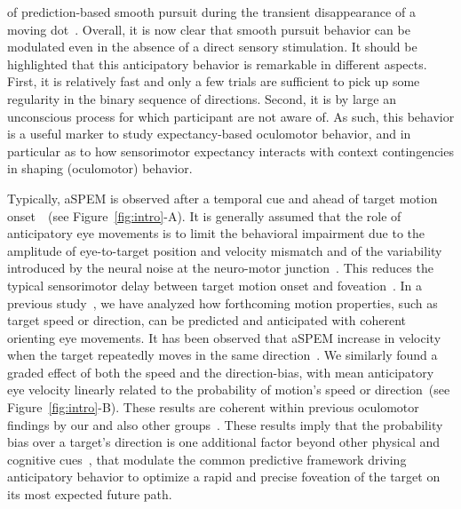 \documentclass[profile,final,english, draft]{article}%
\newcommand{\citep}[1]{\parencite{#1}}
\newcommand{\seeFig}[1]{Figure~\ref{fig:#1}}
\begin{document}
of prediction-based smooth pursuit during
the transient disappearance of a moving dot~\citep{Badler2006,BeckerFuchs1985}.
Overall, it is now clear that smooth pursuit behavior
can be modulated even in the absence of a direct sensory stimulation.
It should be highlighted that this anticipatory behavior is remarkable 
in different aspects. 
First, it is relatively fast and only a few trials are sufficient
to pick up some regularity in the binary sequence of directions.
Second, it is by large an unconscious process
for which participant are not aware of.
As such, this behavior is a useful marker 
to study expectancy-based oculomotor behavior,
and in particular as to how sensorimotor expectancy interacts
with context contingencies in shaping (oculomotor) behavior.

Typically, aSPEM is observed after a temporal cue and
ahead of target motion onset~\citep{Kowler1979a,Kowler1979b, Kowler1984}~(see \seeFig{intro}-A).
It is generally assumed that the role of anticipatory eye movements is
to limit the behavioral impairment due
to the amplitude of eye-to-target position and velocity mismatch and
of the variability introduced by the neural noise 
at the neuro-motor junction~\citep{WolpertXXX}.
This reduces the typical sensorimotor delay
between target motion onset and foveation~\citep{PerrinetAdamasFriston2014}.
In a previous study~\citep{Montagnini2010},
we have analyzed how forthcoming motion properties,
such as target speed or direction, can be
predicted and anticipated with coherent orienting eye movements.
It has been observed that aSPEM increase in velocity
when the target repeatedly moves in the same direction~\citep{Kowler1984, Kowler1989, Heinen2005}.
We similarly found a graded effect of both the speed and the direction-bias,
with mean anticipatory eye velocity
linearly related to the probability of motion's speed or direction~(see \seeFig{intro}-B).
These results are coherent within previous oculomotor findings
by our and also other groups~\citep{SantosKowler2017}.
These results imply that the probability bias over a target's direction is
one additional factor beyond other physical and cognitive cues~\citep{Kowler2014, SantosKowler2017},
that modulate the common predictive framework
driving anticipatory behavior to optimize a rapid and
precise foveation of the target on its most expected future path.
\end{document}

